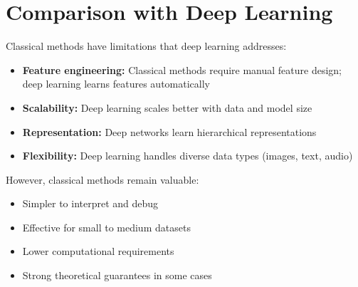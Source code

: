 
\section{Comparison with Deep Learning}
\label{sec:comparison}

Classical methods have limitations that deep learning addresses:

\begin{itemize}
    \item \textbf{Feature engineering:} Classical methods require manual feature design; deep learning learns features automatically
    \item \textbf{Scalability:} Deep learning scales better with data and model size
    \item \textbf{Representation:} Deep networks learn hierarchical representations
    \item \textbf{Flexibility:} Deep learning handles diverse data types (images, text, audio)
\end{itemize}

However, classical methods remain valuable:
\begin{itemize}
    \item Simpler to interpret and debug
    \item Effective for small to medium datasets
    \item Lower computational requirements
    \item Strong theoretical guarantees in some cases
\end{itemize}
